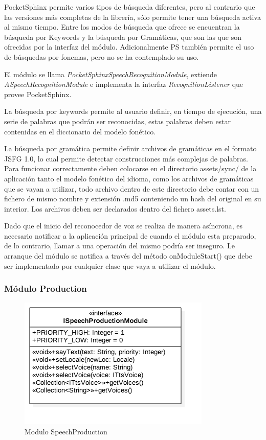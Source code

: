 PocketSphinx permite varios tipos de búsqueda diferentes, pero al contrario que las versiones más completas de la librería, sólo permite tener una búsqueda activa al mismo tiempo.
Entre los modos de búsqueda que ofrece se encuentran la búsqueda por Keywords y la búsqueda por Gramáticas, que son las que son ofrecidas por la interfaz del módulo. Adicionalmente PS también permite el uso de búsquedas por fonemas, pero no se ha contemplado su uso.

El módulo se llama  \textit{PocketSphinxSpeechRecognitionModule}, extiende \textit{ASpeechRecognitionModule} e implementa la interfaz \textit{RecognitionListener} que provee PocketSphinx.

La búsqueda por keywords permite al usuario definir, en tiempo de ejecución, una serie de palabras que podrán ser reconocidas, estas palabras deben estar contenidas en el diccionario del modelo fonético.

La búsqueda por gramática permite definir archivos de gramáticas en el formato  JSFG 1.0\cite{JSFGGrammar}, lo cual permite detectar construcciones más complejas de palabras.
Para funcionar correctamente deben colocarse en el directorio assets/sync/ de la aplicación tanto el modelo fonético del idioma, como los archivos de gramáticas que se vayan a utilizar, todo archivo dentro de este directorio debe contar con un fichero de mismo nombre y extensión .md5 conteniendo un hash del original en su interior. Los archivos deben ser declarados dentro del fichero assets.lst.

Dado que el inicio del reconocedor de voz se realiza de manera asíncrona, es necesario notificar a la aplicación principal de cuando el módulo esta preparado, de lo contrario, llamar a una operación del mismo podría ser inseguro. Le arranque del módulo se notifica a través del método onModuleStart() que debe ser implementado por cualquier clase que vaya a utilizar el  módulo.


\subsubsection{Módulo Production}
\begin{figure}
	\centering
	\includegraphics[width=0.6\linewidth]{imagenes/ISpeechProductionModule.png}
	\caption{Modulo SpeechProduction}
	\label{fig:speech-production-module}
\end{figure}


